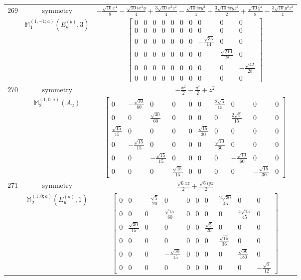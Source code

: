\documentclass[fleqn,8pt,landscape]{jsarticle}
\begin{document}
\begin{longtable}{ccc}
$ 269 $ & $ \text{symmetry} $ & $ - \frac{\sqrt{10} x^{4}}{8} - \frac{\sqrt{10} i x^{3} y}{4} + \frac{3 \sqrt{10} x^{2} z^{2}}{4} - \frac{\sqrt{10} i x y^{3}}{4} + \frac{3 \sqrt{10} i x y z^{2}}{2} + \frac{\sqrt{10} y^{4}}{8} - \frac{3 \sqrt{10} y^{2} z^{2}}{4} $ \\
$  $ & $ \mathbb{M}_{4}^{(1,-1;a)}(E_{u}^{(b)},3) $ & $ \begin{bmatrix} 0 & 0 & 0 & 0 & 0 & 0 & 0 & 0 & 0 & 0 \\ 0 & 0 & 0 & 0 & 0 & 0 & 0 & 0 & 0 & 0 \\ 0 & 0 & 0 & 0 & 0 & 0 & 0 & - \frac{\sqrt{35}}{14} & 0 & 0 \\ 0 & 0 & 0 & 0 & 0 & 0 & 0 & 0 & \frac{\sqrt{210}}{28} & 0 \\ 0 & 0 & 0 & 0 & 0 & 0 & 0 & 0 & 0 & - \frac{\sqrt{42}}{28} \\ 0 & 0 & 0 & 0 & 0 & 0 & 0 & 0 & 0 & 0 \end{bmatrix} $ \\ \hline
$ 270 $ & $ \text{symmetry} $ & $ - \frac{x^{2}}{2} - \frac{y^{2}}{2} + z^{2} $ \\
$  $ & $ \mathbb{M}_{2}^{(1,0;a)}(A_{u}) $ & $ \begin{bmatrix} 0 & - \frac{\sqrt{30}}{60} & 0 & 0 & 0 & 0 & \frac{2 \sqrt{5}}{15} & 0 & 0 & 0 \\ 0 & 0 & \frac{\sqrt{30}}{60} & 0 & 0 & 0 & 0 & \frac{2 \sqrt{5}}{15} & 0 & 0 \\ \frac{\sqrt{15}}{15} & 0 & 0 & 0 & 0 & \frac{\sqrt{15}}{30} & 0 & 0 & 0 & 0 \\ 0 & - \frac{\sqrt{15}}{15} & 0 & 0 & 0 & 0 & \frac{\sqrt{10}}{60} & 0 & 0 & 0 \\ 0 & 0 & - \frac{\sqrt{15}}{15} & 0 & 0 & 0 & 0 & - \frac{\sqrt{10}}{60} & 0 & 0 \\ 0 & 0 & 0 & \frac{\sqrt{15}}{15} & 0 & 0 & 0 & 0 & - \frac{\sqrt{15}}{30} & 0 \end{bmatrix} $ \\ \hline
$ 271 $ & $ \text{symmetry} $ & $ \frac{\sqrt{6} x z}{2} + \frac{\sqrt{6} i y z}{2} $ \\
$  $ & $ \mathbb{M}_{2}^{(1,0;a)}(E_{u}^{(a)},1) $ & $ \begin{bmatrix} 0 & 0 & - \frac{\sqrt{5}}{20} & 0 & 0 & 0 & 0 & \frac{2 \sqrt{30}}{45} & 0 & 0 \\ 0 & 0 & 0 & \frac{\sqrt{15}}{60} & 0 & 0 & 0 & 0 & \frac{4 \sqrt{15}}{45} & 0 \\ 0 & \frac{\sqrt{30}}{15} & 0 & 0 & 0 & 0 & \frac{\sqrt{5}}{20} & 0 & 0 & 0 \\ 0 & 0 & 0 & 0 & 0 & 0 & 0 & \frac{\sqrt{15}}{36} & 0 & 0 \\ 0 & 0 & 0 & - \frac{\sqrt{30}}{15} & 0 & 0 & 0 & 0 & \frac{\sqrt{30}}{180} & 0 \\ 0 & 0 & 0 & 0 & 0 & 0 & 0 & 0 & 0 & - \frac{\sqrt{2}}{12} \end{bmatrix} $ \\ \hline

\end{longtable}
\end{document}
